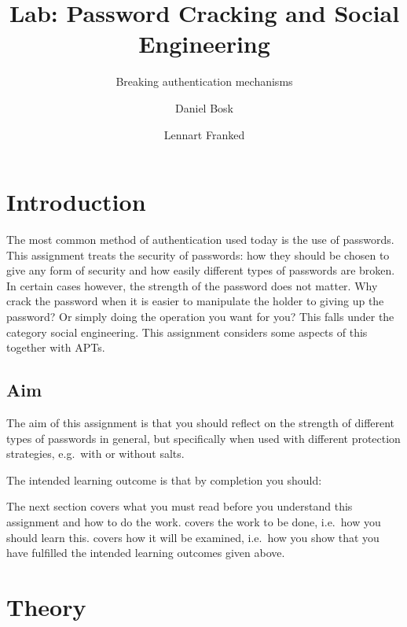 \title{%
  Lab: Password Cracking and Social Engineering
}
\subtitle{%
  Breaking authentication mechanisms
}
\author{%
  Daniel Bosk \and Lennart Franked
}

\maketitle


\section{Introduction}
\label{sec:Introduktion}
The most common method of authentication used today is the use of passwords.
This assignment treats the security of passwords: how they should be chosen to 
give any form of security and how easily different types of passwords are 
broken.
In certain cases however, the strength of the password does not matter.
Why crack the password when it is easier to manipulate the holder to giving up 
the password?
Or simply doing the operation you want for you?
This falls under the category social engineering.
This assignment considers some aspects of this together with \acp{APT}.

\subsection{Aim}
\label{sec:Syfte}
The aim of this assignment is that you should reflect on the strength of 
different types of passwords in general, but specifically when used with 
different protection strategies, e.g.~with or without salts.

The intended learning outcome is that by completion you should:
\begin{itemize}
	
\end{itemize}

The next section covers what you must read before you understand this 
assignment and how to do the work.
 covers the work to be done, i.e.~how you should learn this.
 covers how it will be examined, i.e.~how you show that you have 
fulfilled the intended learning outcomes given above.


\section{Theory}
\label{sec:theory}




